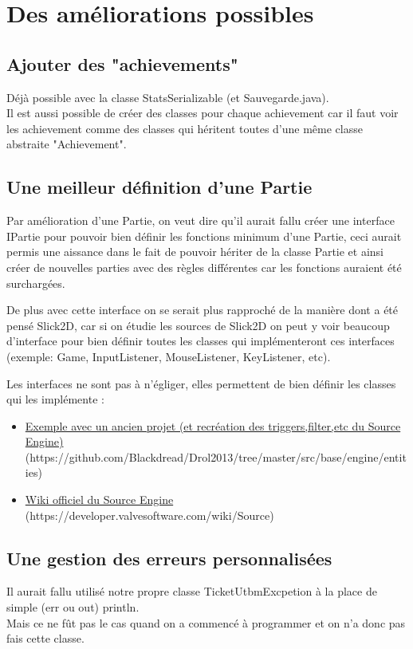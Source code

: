 \documentclass{report}
\begin{document}
\section{Des améliorations possibles}
\subsection{Ajouter des "achievements"}
Déjà possible avec la classe StatsSerializable (et Sauvegarde.java).\\
Il est aussi possible de créer des classes pour chaque achievement car il faut voir les achievement comme des classes qui héritent toutes d'une même classe abstraite "Achievement".
\subsection{Une meilleur définition d'une Partie}
Par amélioration d'une Partie, on veut dire qu'il aurait fallu créer une interface IPartie pour pouvoir bien définir les fonctions minimum d'une Partie, ceci aurait permis une aissance dans le fait de pouvoir hériter de la classe Partie et ainsi créer de nouvelles parties avec des règles différentes car les fonctions auraient été surchargées.


De plus avec cette interface on se serait plus rapproché de la manière dont a été pensé Slick2D, car si on étudie les sources de Slick2D on peut y voir beaucoup d'interface pour bien définir toutes les classes qui implémenteront ces interfaces (exemple: Game, InputListener, MouseListener, KeyListener, etc).


Les interfaces ne sont pas à n'égliger, elles permettent de bien définir les classes qui les implémente :
\begin{itemize}
\item \href{https://github.com/Blackdread/Drol2013/tree/master/src/base/engine/entities}{Exemple avec un ancien projet (et recréation des triggers,filter,etc du Source Engine)}  (https://github.com/Blackdread/Drol2013/tree/master/src/base/engine/entities)
\item \href{https://developer.valvesoftware.com/wiki/Source}{Wiki officiel du Source Engine}  (https://developer.valvesoftware.com/wiki/Source)
\end{itemize}
\subsection{Une gestion des erreurs personnalisées}
Il aurait fallu utilisé notre propre classe TicketUtbmExcpetion à la place de simple (err ou out) println.\\ Mais ce ne fût pas le cas quand on a commencé à programmer et on n'a donc pas fais cette classe.

\end{document}
